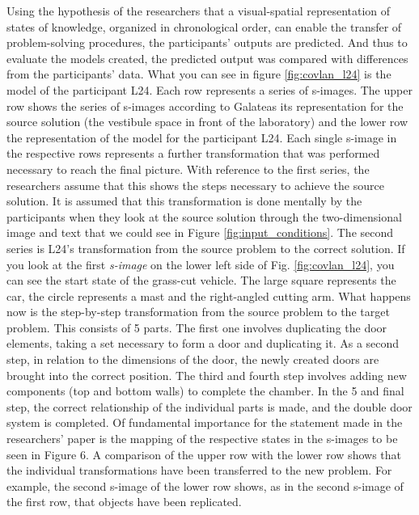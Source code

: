 \documentclass[12pt]{article}
\begin{document}
Using the hypothesis of the researchers that a visual-spatial representation of states of knowledge, organized in chronological order, can enable the transfer of problem-solving procedures, the participants' outputs are predicted. And thus to evaluate the models created, the predicted output was compared with differences from the participants' data. What you can see in figure \ref{fig:covlan_l24} is the model of the participant L24. Each row represents a series of s-images. The upper row shows the series of s-images according to Galateas its representation for the source solution (the vestibule space in front of the laboratory) and the lower row the representation of the model for the participant L24. Each single s-image in the respective rows represents a further transformation that was performed necessary to reach the final picture. With reference to the first series, the researchers assume that this shows the steps necessary to achieve the source solution. It is assumed that this transformation is done mentally by the participants when they look at the source solution through the two-dimensional image and text that we could see in Figure \ref{fig:input_conditions}. The second series is L24's transformation from the source problem to the correct solution. If you look at the first \textit{s-image} on the lower left side of Fig. \ref{fig:covlan_l24}, you can see the start state of the grass-cut vehicle. The large square represents the car, the circle represents a mast and the right-angled cutting arm. What happens now is the step-by-step transformation from the source problem to the target problem. This consists of 5 parts. The first one involves duplicating the door elements, taking a set necessary to form a door and duplicating it. As a second step, in relation to the dimensions of the door, the newly created doors are brought into the correct position. The third and fourth step involves adding new components (top and bottom walls) to complete the chamber. In the 5 and final step, the correct relationship of the individual parts is made, and the double door system is completed. Of fundamental importance for the statement made in the researchers' paper is the mapping of the respective states in the s-images to be seen in Figure 6. A comparison of the upper row with the lower row shows that the individual transformations have been transferred to the new problem. For example, the second s-image of the lower row shows, as in the second s-image of the first row, that objects have been replicated.
\end{document}
